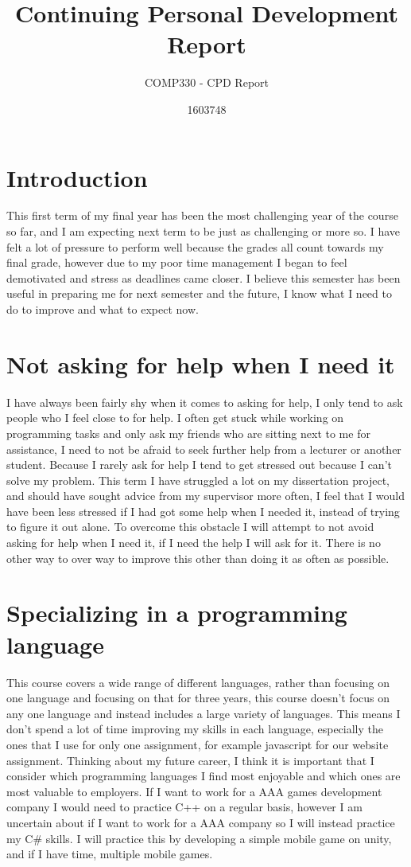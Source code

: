 \documentclass{scrartcl}
\title{Continuing Personal Development Report}
\subtitle{COMP330 - CPD Report}
\author{1603748}
\begin{document}
\maketitle

\section*{Introduction}
This first term of my final year has been the most challenging year of the course so far, and I am expecting next term to be just as challenging or more so. I have felt a lot of pressure to perform well because the grades all count towards my final grade, however due to my poor time management I began to feel demotivated and stress as deadlines came closer. I believe this semester has been useful in preparing me for next semester and the future, I know what I need to do to improve and what to expect now. 

\section{Not asking for help when I need it}
I have always been fairly shy when it comes to asking for help, I only tend to ask people who I feel close to for help. I often get stuck while working on programming tasks and only ask my friends who are sitting next to me for assistance, I need to not be afraid to seek further help from a lecturer or another student. Because I rarely ask for help I tend to get stressed out because I can't solve my problem. This term I have struggled a lot on my dissertation project, and should have sought advice from my supervisor more often, I feel that I would have been less stressed if I had got some help when I needed it, instead of trying to figure it out alone. To overcome this obstacle I will attempt to not avoid asking for help when I need it, if I need the help I will ask for it. There is no other way to over way to improve this other than doing it as often as possible. 

\section{Specializing in a programming language}
This course covers a wide range of different languages, rather than focusing on one language and focusing on that for three years, this course doesn't focus on any one language and instead includes a large variety of languages. This means I don't spend a lot of time improving my skills in each language, especially the ones that I use for only one assignment, for example javascript for our website assignment. Thinking about my future career, I think it is important that I consider which programming languages I find most enjoyable and which ones are most valuable to employers. If I want to work for a AAA games development company I would need to practice C++ on a regular basis, however I am uncertain about if I want to work for a AAA company so I will instead practice my C# skills. I will practice this by developing a simple mobile game on unity, and if I have time, multiple mobile games. 
\end{document}
